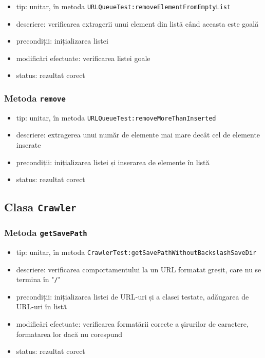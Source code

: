 \documentclass[12pt]{article}
\begin{document}
\begin{itemize}
    \item tip: unitar, în metoda \texttt{URLQueueTest:removeElementFromEmptyList}
    \item descriere: verificarea extragerii unui element din listă când aceasta este goală
    \item precondiții: inițializarea listei
    \item modificări efectuate: verificarea listei goale
    \item status: rezultat corect
\end{itemize}

\subsubsection{Metoda \texttt{remove}}

\begin{itemize}
    \item tip: unitar, în metoda \texttt{URLQueueTest:removeMoreThanInserted}
    \item descriere: extragerea unui număr de elemente mai mare decât cel de elemente inserate
    \item precondiții: inițializarea listei și inserarea de elemente în listă
    \item status: rezultat corect
\end{itemize}

\subsection{Clasa \texttt{Crawler}}

\subsubsection{Metoda \texttt{getSavePath}}

\begin{itemize}
    \item tip: unitar, în metoda \texttt{CrawlerTest:getSavePathWithoutBackslashSaveDir}
    \item descriere: verificarea comportamentului la un URL formatat greșit, care nu se termina în "\texttt{/}"
    \item precondiții: inițializarea listei de URL-uri și a clasei testate, adăugarea de URL-uri în listă
    \item modificări efectuate: verificarea formatării corecte a șirurilor de caractere, formatarea lor dacă nu corespund
    \item status: rezultat corect
\end{itemize}
\end{document}
